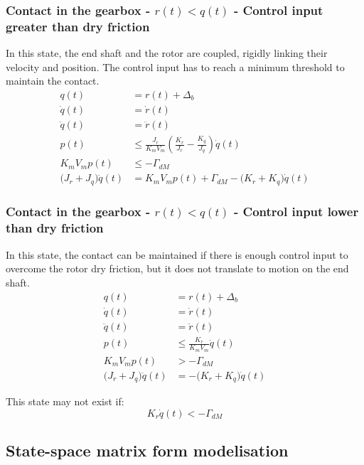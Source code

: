 \documentclass[english,12pt,a4paper]{article}
\begin{document}
		\subsubsection{Contact in the gearbox - $r(t)<q(t)$ - Control input greater than dry friction}
			In this state, the end shaft and the rotor are coupled, rigidly linking their velocity and position. The control input has to reach a minimum threshold to maintain the contact.
			\begin{align}
				q(t) &= r(t) + \Delta_b \\
				\dot{q}(t) &= \dot{r}(t) \\
				\ddot{q}(t) &= \ddot{r}(t) \\
				p(t) &\le \frac{J_r}{K_m V_m} \left( \frac{K_r}{J_r} - \frac{K_q}{J_q} \right) \dot{q}(t) \\
				K_mV_mp(t) &\le -\Gamma_{dM} \\
				\big( J_r + J_q \big) \ddot{q}(t) &= K_mV_mp(t) + \Gamma_{dM} - \big(K_r+K_q\big)\dot{q}(t)
			\end{align}
		
		
		\subsubsection{Contact in the gearbox - $r(t)<q(t)$ - Control input lower than dry friction}
			In this state, the contact can be maintained if there is enough control input to overcome the rotor dry friction, but it does not translate to motion on the end shaft.
			\begin{align}
				q(t) &= r(t) + \Delta_b \\
				\dot{q}(t) &= \dot{r}(t) \\
				\ddot{q}(t) &= \ddot{r}(t) \\
				p(t) &\le \frac{K_r}{K_m V_m} \dot{q}(t) \\
				K_mV_mp(t) &> -\Gamma_{dM} \\
				\big( J_r + J_q \big) \ddot{q}(t) &= - \big(K_r+K_q\big)\dot{q}(t)
			\end{align}
			
			This state may not exist if:
			\begin{equation}
				K_r \dot{q}(t) < -\Gamma_{dM}
			\end{equation}
	
	\subsection{State-space matrix form modelisation}
	
\end{document}
